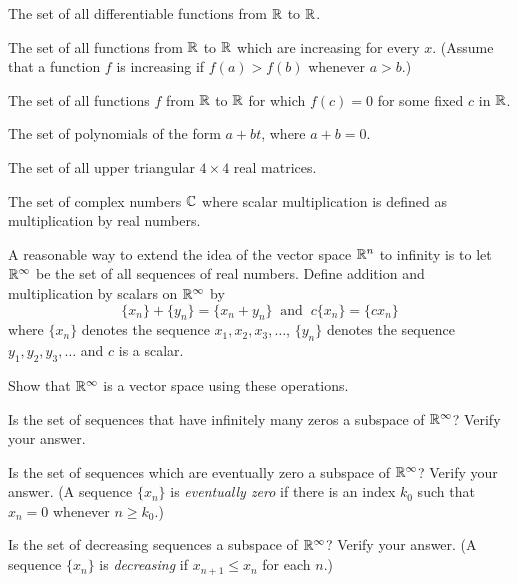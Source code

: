\item The set of all differentiable functions from $\mathbb{R}$ to $\mathbb{R}$.

\item The set of all functions from $\mathbb{R}$ to $\mathbb{R}$ which are increasing for every $x$. (Assume that a function $f$ is increasing if $f(a) > f(b)$ whenever $a > b$.)

\item The set of all functions $f$ from $\mathbb{R}$ to $\mathbb{R}$ for which $f(c)=0$ for some fixed $c$ in $\mathbb{R}$.  

\item The set of polynomials of the form $a+bt$, where $a+b=0$.  


\item The set of all upper triangular $4\times 4$ real matrices.

\item The set of complex numbers $\mathbb{C}$ where scalar multiplication is defined as multiplication by real numbers.

\ea

\item A reasonable way to extend the idea of the vector space $\mathbb{R}^n$ to infinity is to let $\mathbb{R}^\infty$ be the set of all sequences of real numbers. Define addition and multiplication by scalars on $\mathbb{R}^{\infty}$ by 
\[\{x_n\} + \{y_n\} = \{x_n + y_n\} \ \text{ and } \ c\{x_n\} = \{cx_n\}\]
where $\{x_n\}$ denotes the sequence $x_1, x_2, x_3, \ldots$, $\{y_n\}$ denotes the sequence $y_1, y_2, y_3, \ldots$ and $c$ is a scalar. 
	\ba
	\item Show that $\mathbb{R}^{\infty}$ is a vector space using these operations. 



	\item Is the set of sequences that have infinitely many zeros a subspace of $\mathbb{R}^{\infty}$? Verify your answer. 


   	\item Is the set of sequences which are eventually zero a subspace of $\mathbb{R}^{\infty}$? Verify your answer. (A sequence $\{x_n\}$ is \emph{eventually zero} if there is an  index $k_0$ such that $x_n = 0$ whenever $n \geq k_0$.) 


	 \item Is the set of decreasing sequences a subspace of $\mathbb{R}^{\infty}$? Verify your answer. (A sequence $\{x_n\}$ is \emph{decreasing} if $x_{n+1} \leq x_n$ for each $n$.) 

